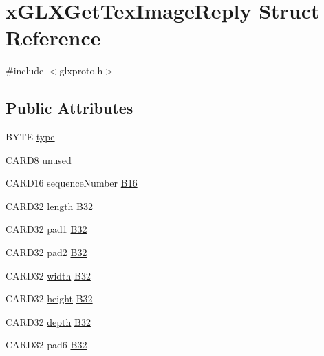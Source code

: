 \hypertarget{structx_g_l_x_get_tex_image_reply}{}\section{x\+G\+L\+X\+Get\+Tex\+Image\+Reply Struct Reference}
\label{structx_g_l_x_get_tex_image_reply}


{\ttfamily \#include $<$glxproto.\+h$>$}

\subsection*{Public Attributes}
\begin{DoxyCompactItemize}
\item 
B\+Y\+TE \hyperlink{structx_g_l_x_get_tex_image_reply_a899a2838047463c4a96f433829311ec0}{type}
\item 
C\+A\+R\+D8 \hyperlink{structx_g_l_x_get_tex_image_reply_ae9ba2944b0717d9784549ea57aa1d75a}{unused}
\item 
C\+A\+R\+D16 sequence\+Number \hyperlink{structx_g_l_x_get_tex_image_reply_ab9fae3b546893ce4c8333789c8261779}{B16}
\item 
C\+A\+R\+D32 \hyperlink{glcorearb_8h_ab9c919755bde3b34349e23a32b4e0fa7}{length} \hyperlink{structx_g_l_x_get_tex_image_reply_a40444f522bc3c2712970005485dde6ea}{B32}
\item 
C\+A\+R\+D32 pad1 \hyperlink{structx_g_l_x_get_tex_image_reply_a2674e58330ab8efb23eec70f90824da1}{B32}
\item 
C\+A\+R\+D32 pad2 \hyperlink{structx_g_l_x_get_tex_image_reply_aabc551b7157a60b5d177b3a09663c5ec}{B32}
\item 
C\+A\+R\+D32 \hyperlink{gl_8h_a9a82cf3caff84cabc4598e2619faac17}{width} \hyperlink{structx_g_l_x_get_tex_image_reply_a304f40eef47a3723ade034f8444aa4cd}{B32}
\item 
C\+A\+R\+D32 \hyperlink{gl_8h_aa352f2804b9902ac30769c00dde75d5f}{height} \hyperlink{structx_g_l_x_get_tex_image_reply_a95e9cbadce05491f046b211ecc9e24a9}{B32}
\item 
C\+A\+R\+D32 \hyperlink{gl_8h_aa8bd8cf1eef34712fdb6ad58b540a2ee}{depth} \hyperlink{structx_g_l_x_get_tex_image_reply_afd2768a06f92d2d1e557423713c8e8f0}{B32}
\item 
C\+A\+R\+D32 pad6 \hyperlink{structx_g_l_x_get_tex_image_reply_ab3b1b71cf28c8f836603bd72fb9a1a9d}{B32}
\end{DoxyCompactItemize}


